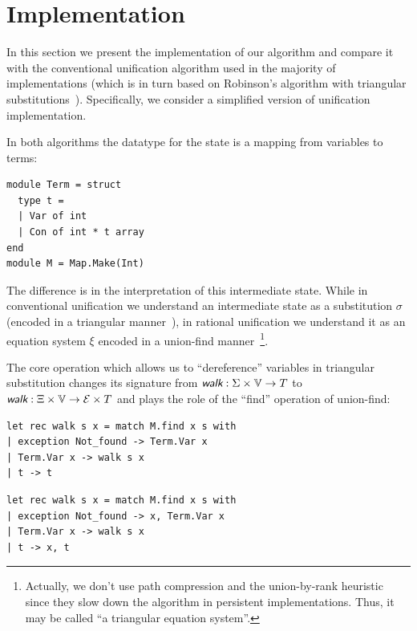 \section{Implementation}

In this section we present the implementation of our algorithm and compare it with the conventional unification algorithm used in the majority of \miniKanren implementations
(which is in turn based on Robinson's algorithm with triangular substitutions~\cite{baader2001unification}). Specifically, we consider a simplified version of \OCanren
unification implementation.

In both algorithms the datatype for the state is a mapping from variables to terms:

\begin{verbatim}
module Term = struct
  type t =
  | Var of int
  | Con of int * t array
end
module M = Map.Make(Int)
\end{verbatim}

The difference is in the interpretation of this intermediate state. While in conventional unification we understand an intermediate state as a substitution $\sigma$ (encoded
in a triangular manner~\cite{baader2001unification}), in rational unification we understand it as an equation system $\xi$ encoded in a union-find manner~\cite{arden1961algorithm}\footnote{Actually, we don't use path compression and the union-by-rank heuristic since they slow down the algorithm in persistent implementations. Thus, it may be called ``a triangular equation system''.}.

The core operation \walk which allows us to ``dereference'' variables in triangular substitution changes its signature from $\walk : \Sigma \times \V \rightarrow T$ to $\walk : \Xi \times \V \rightarrow \E \times T$ and plays the role of the ``find'' operation of union-find:

\begin{center}
    \begin{minipage}{0.46\textwidth}
        \centering
        \begin{verbatim}
let rec walk s x = match M.find x s with
| exception Not_found -> Term.Var x
| Term.Var x -> walk s x
| t -> t
        \end{verbatim}
    \end{minipage}
    \hfill
    \vrule
    \hfill
    \begin{minipage}{0.46\textwidth}
        \centering
        \begin{verbatim}
let rec walk s x = match M.find x s with
| exception Not_found -> x, Term.Var x
| Term.Var x -> walk s x
| t -> x, t
        \end{verbatim}
    \end{minipage}
\end{center}

